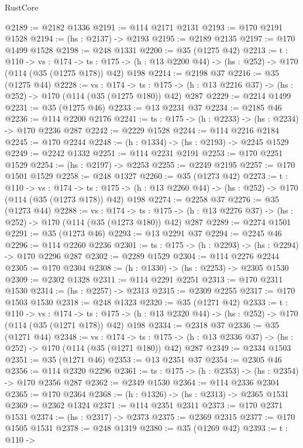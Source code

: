 \begin{lexlean}{RustCore}
\begin{coremodule}
@2189 := @2182 @1336
@2191 := @114 @2171 @2131
@2193 := @170 @2191 @1528
@2194 := (hs : @2137) -> @2193
@2195 := @2189 @2135
@2197 := @170 @1499 @1528
@2198 := @248 @1331
@2200 := @35 (@1275 @42)
@2213 := {t : @110} ->
  {vs : @174} ->
  {ts : @175} -> (h : @13 @2200 @44) -> (hs : @252) -> @170 (@114 (@35 (@1275 @178)) @42) @198
@2214 := @2198 @37
@2216 := @35 (@1275 @44)
@2228 := {vs : @174} ->
  {ts : @175} -> (h : @13 @2216 @37) -> (hs : @252) -> @170 (@114 (@35 (@1275 @180)) @42) @287
@2229 := @2214 @1499
@2231 := @35 (@1275 @46)
@2233 := @13 @2231 @37
@2234 := @2185 @46
@2236 := @114 @2200 @2176
@2241 := {ts : @175} -> (h : @2233) -> (hs : @2234) -> @170 @2236 @287
@2242 := @2229 @1528
@2244 := @114 @2216 @2184
@2245 := @170 @2244
@2248 := (h : @1334) -> (hs : @2193) -> @2245 @1529
@2249 := @2242 @1332
@2251 := @114 @2231 @2191
@2253 := @170 @2251 @1529
@2254 := (hs : @2197) -> @2253
@2255 := @2249 @2195
@2257 := @170 @1501 @1529
@2258 := @248 @1327
@2260 := @35 (@1273 @42)
@2273 := {t : @110} ->
  {vs : @174} ->
  {ts : @175} -> (h : @13 @2260 @44) -> (hs : @252) -> @170 (@114 (@35 (@1273 @178)) @42) @198
@2274 := @2258 @37
@2276 := @35 (@1273 @44)
@2288 := {vs : @174} ->
  {ts : @175} -> (h : @13 @2276 @37) -> (hs : @252) -> @170 (@114 (@35 (@1273 @180)) @42) @287
@2289 := @2274 @1501
@2291 := @35 (@1273 @46)
@2293 := @13 @2291 @37
@2294 := @2245 @46
@2296 := @114 @2260 @2236
@2301 := {ts : @175} -> (h : @2293) -> (hs : @2294) -> @170 @2296 @287
@2302 := @2289 @1529
@2304 := @114 @2276 @2244
@2305 := @170 @2304
@2308 := (h : @1330) -> (hs : @2253) -> @2305 @1530
@2309 := @2302 @1328
@2311 := @114 @2291 @2251
@2313 := @170 @2311 @1530
@2314 := (hs : @2257) -> @2313
@2315 := @2309 @2255
@2317 := @170 @1503 @1530
@2318 := @248 @1323
@2320 := @35 (@1271 @42)
@2333 := {t : @110} ->
  {vs : @174} ->
  {ts : @175} -> (h : @13 @2320 @44) -> (hs : @252) -> @170 (@114 (@35 (@1271 @178)) @42) @198
@2334 := @2318 @37
@2336 := @35 (@1271 @44)
@2348 := {vs : @174} ->
  {ts : @175} -> (h : @13 @2336 @37) -> (hs : @252) -> @170 (@114 (@35 (@1271 @180)) @42) @287
@2349 := @2334 @1503
@2351 := @35 (@1271 @46)
@2353 := @13 @2351 @37
@2354 := @2305 @46
@2356 := @114 @2320 @2296
@2361 := {ts : @175} -> (h : @2353) -> (hs : @2354) -> @170 @2356 @287
@2362 := @2349 @1530
@2364 := @114 @2336 @2304
@2365 := @170 @2364
@2368 := (h : @1326) -> (hs : @2313) -> @2365 @1531
@2369 := @2362 @1324
@2371 := @114 @2351 @2311
@2373 := @170 @2371 @1531
@2374 := (hs : @2317) -> @2373
@2375 := @2369 @2315
@2377 := @170 @1505 @1531
@2378 := @248 @1319
@2380 := @35 (@1269 @42)
@2393 := {t : @110} ->

\end{coremodule}
\end{lexlean}
